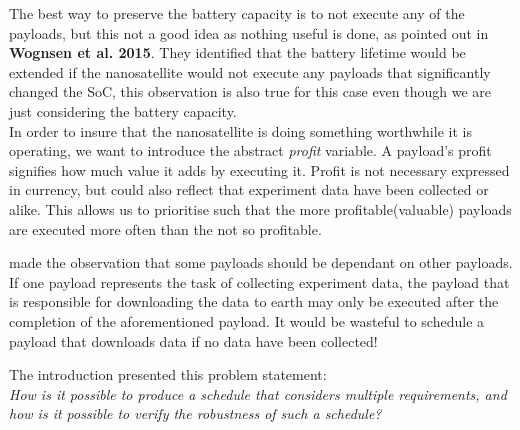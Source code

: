 The best way to preserve the battery capacity is to not execute any of the payloads, but this not a good idea as nothing useful is done, as pointed out in \textbf{Wognsen et al. 2015}\cite{score_function}. They identified that the battery lifetime would be extended if the nanosatellite would not execute any payloads that significantly changed the SoC, this observation is also true for this case even though we are just considering the battery capacity.\\
In order to insure that the nanosatellite is doing something worthwhile it is operating, we want to introduce the abstract \textit{profit} variable. A payload's profit signifies how much value it adds by executing it. Profit is not necessary expressed in currency, but could also reflect that experiment data have been collected or alike. This allows us to prioritise such that the more profitable(valuable) payloads are executed more often than the not so profitable.

\cite{gomx3} made the observation that some payloads should be dependant on other payloads. If one payload represents the task of collecting experiment data, the payload that is responsible for downloading the data to earth may only be executed after the completion of the aforementioned payload. It would be wasteful to schedule a payload that downloads data if no data have been collected! %




The introduction presented this problem statement:\\
\textit{How is it possible to produce a schedule that considers multiple requirements, and how is it possible to verify the robustness of such a schedule?}

